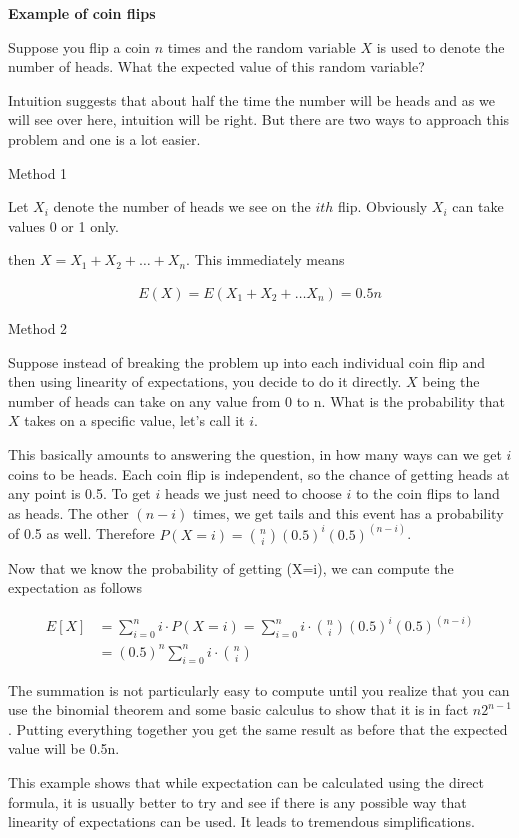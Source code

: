 \documentclass[12pt]{article}
\begin{document}
\textbf{Example of coin flips}

Suppose you flip a coin $n$ times and the random variable $X$ is used to denote the number of heads. What the expected value of this random variable?

Intuition suggests that about half the time the number will be heads and as we will see over here, intuition will be right. But there are two ways to approach this problem and one is a lot easier.

Method 1

Let $X_i$ denote the number of heads we see on the $ith$ flip. Obviously $X_i$ can take values 0 or 1 only. 

then $X = X_1 + X_2 + \ldots + X_n$. This immediately means

\begin{align*}
E(X) = E(X_1 + X_2 + \ldots X_n) = 0.5n
\end{align*}

Method 2

Suppose instead of breaking the problem up into each individual coin flip and then using linearity of expectations, you decide to do it directly. $X$ being the number of heads can take on any value from 0 to n. What is the probability that $X$ takes on a specific value, let's call it $i$. 

This basically amounts to answering the question, in how many ways can we get $i$ coins to be heads. Each coin flip is independent, so the chance of getting heads at any point is 0.5. To get $i$ heads we just need to choose $i$ to the coin flips to land as heads. The other $(n-i)$ times, we get tails and this event has a probability of 0.5 as well. Therefore $P(X=i) = \binom{n}{i}(0.5)^i(0.5)^{(n-i)}$.

Now that we know the probability of getting (X=i), we can compute the expectation as follows

\begin{align*}
E[X] &= \sum_{i=0}^n i \cdot P(X=i) = \sum_{i=0}^n i \cdot \binom{n}{i}(0.5)^i(0.5)^{(n-i)} \\
&=(0.5)^n \sum_{i=0}^n i \cdot \binom{n}{i}
\end{align*}

The summation is not particularly easy to compute until you realize that you can use the binomial theorem and some basic calculus to show that it is in fact $n2^{n-1}$. Putting everything together you get the same result as before that the expected value will be 0.5n.

This example shows that while expectation can be calculated using the direct formula, it is usually better to try and see if there is any possible way that linearity of expectations can be used. It leads to tremendous simplifications.
\end{document}
